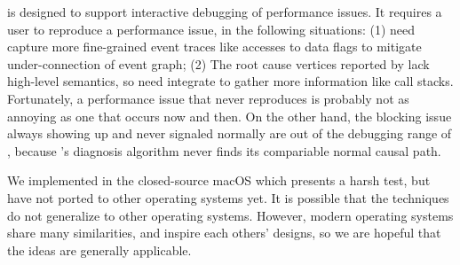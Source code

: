 \xxx is designed to support interactive debugging of performance issues. It
requires a user to reproduce a performance issue, in the following situations:
(1) \xxx need capture more fine-grained event traces like accesses to data
flags to mitigate under-connection of event graph; (2) The root cause vertices
reported by \xxx lack high-level semantics, so \xxx need integrate  to
gather more information like call stacks. Fortunately, a performance issue that
never reproduces is probably not as annoying as one that occurs now and then. On
the other hand, the blocking issue always showing up and never signaled normally
are out of the debugging range of \xxx, because \xxx's diagnosis algorithm never
finds its compariable normal causal path.

We implemented \xxx in the closed-source macOS which presents a harsh test,
but have not ported \xxx to other operating systems yet. It is possible
that the techniques do not generalize to other operating systems. However,
modern operating systems share many similarities, and inspire each others'
designs, so we are hopeful that the ideas are generally applicable.


